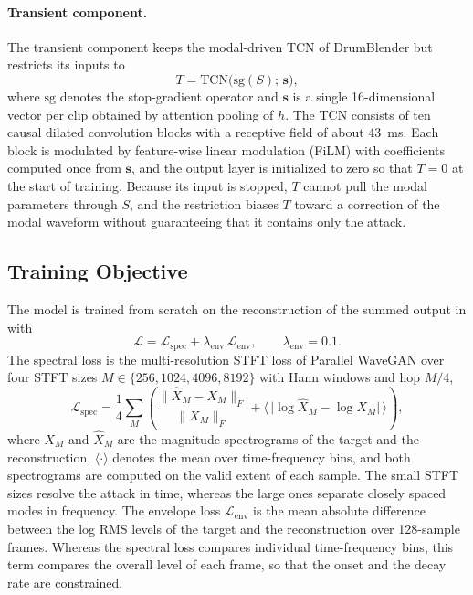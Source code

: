 \paragraph{Transient component.}
The transient component keeps the modal-driven TCN of DrumBlender but restricts its inputs to
\begin{equation}
T=\mathrm{TCN}\big(\mathrm{sg}(S);\,\mathbf{s}\big),
\label{eq:transient}
\end{equation}
where $\mathrm{sg}$ denotes the stop-gradient operator and $\mathbf{s}$ is a single 16-dimensional vector per clip obtained by attention pooling of $h$.
The TCN consists of ten causal dilated convolution blocks with a receptive field of about 43~ms.
Each block is modulated by feature-wise linear modulation (FiLM) \citep{perez2018film} with coefficients computed once from $\mathbf{s}$, and the output layer is initialized to zero so that $T=0$ at the start of training.
Because its input is stopped, $T$ cannot pull the modal parameters through $S$, and the restriction biases $T$ toward a correction of the modal waveform without guaranteeing that it contains only the attack.

\subsection{Training Objective}
\label{sec:method-training}
The model is trained from scratch on the reconstruction of the summed output in  with
\begin{equation}
\mathcal{L}=\mathcal{L}_{\mathrm{spec}}+\lambda_{\mathrm{env}}\,\mathcal{L}_{\mathrm{env}},\qquad \lambda_{\mathrm{env}}=0.1.
\label{eq:loss}
\end{equation}
The spectral loss is the multi-resolution STFT loss of Parallel WaveGAN \citep{yamamoto2020parallel} over four STFT sizes $M\in\{256,1024,4096,8192\}$ with Hann windows and hop $M/4$,
\begin{equation}
\mathcal{L}_{\mathrm{spec}}=\frac{1}{4}\sum_{M}\left(\frac{\lVert \hat{X}_M-X_M\rVert_F}{\lVert X_M\rVert_F}+\big\langle\,\lvert\log\hat{X}_M-\log X_M\rvert\,\big\rangle\right),
\label{eq:spec-loss}
\end{equation}
where $X_M$ and $\hat{X}_M$ are the magnitude spectrograms of the target and the reconstruction, $\langle\cdot\rangle$ denotes the mean over time-frequency bins, and both spectrograms are computed on the valid extent of each sample.
The small STFT sizes resolve the attack in time, whereas the large ones separate closely spaced modes in frequency.
The envelope loss $\mathcal{L}_{\mathrm{env}}$ is the mean absolute difference between the log RMS levels of the target and the reconstruction over 128-sample frames.
Whereas the spectral loss compares individual time-frequency bins, this term compares the overall level of each frame, so that the onset and the decay rate are constrained.

